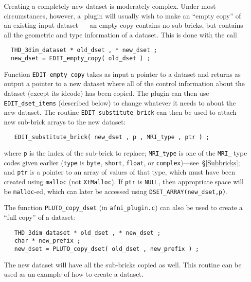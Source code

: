 \label{CreatingDataset}
  Creating a completely new dataset is moderately complex.  Under most
  circumstances, however, a~plugin will usually wish to make an ``empty copy''
  of an existing input dataset --- an empty copy contains no sub-bricks, but contains
  all the geometric and type information of a dataset.
  This is done with the call
\begin{verbatim}
  THD_3dim_dataset * old_dset , * new_dset ;
  new_dset = EDIT_empty_copy( old_dset ) ;
\end{verbatim}
  Function {\tt EDIT\_empty\_copy} takes
  as input a pointer to a dataset and returns as output a pointer to
  a new dataset where all of the control information about the dataset
  (except its idcode) has been copied.
  The plugin can then
  use {\tt EDIT\_dset\_items} (described below) to change whatever it needs to about the
  new dataset.  The routine {\tt EDIT\_substitute\_brick} can then
  be used to attach new sub-brick arrays to the new dataset:
\begin{verbatim}
   EDIT_substitute_brick( new_dset , p , MRI_type , ptr ) ;
\end{verbatim}
  where {\tt p} is the index of the sub-brick to replace;
  {\tt MRI\_type} is one of the {\tt MRI\_}
  type codes given earlier ({\tt type} is {\tt byte}, {\tt short}, {\tt float},
  or {\tt complex})---see~\S\ref{Subbricks}; and {\tt ptr} is a pointer to an array of
  values of that type, which must have been created using {\tt malloc}
  (not {\tt XtMalloc}).
  If {\tt ptr} is {\tt NULL}, then appropriate space will be {\tt malloc}-ed,
  which can later be accessed using {\tt DSET\_ARRAY(new\_dset,p)}.

\vset
  The function {\tt PLUTO\_copy\_dset} (in {\tt afni\_plugin.c})
  can also be used to create a ``full copy'' of a dataset:
\begin{verbatim}
   THD_3dim_dataset * old_dset , * new_dset ;
   char * new_prefix ;
   new_dset = PLUTO_copy_dset( old_dset , new_prefix ) ;
\end{verbatim}
  The new dataset
  will have all the sub-bricks copied as well.  This routine can be used
  as an example of how to create a dataset.

